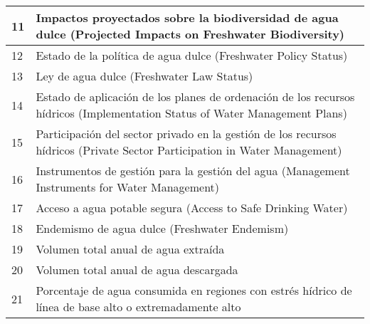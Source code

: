 \begin{longtable}{p{1.75cm}|p{13cm}}
11                                    & Impactos proyectados sobre la biodiversidad de agua dulce (Projected Impacts on Freshwater Biodiversity)                                                  \\ \hline
12                                    & Estado de la política de agua dulce (Freshwater Policy Status)                                                                                          \\ \hline
13                                    & Ley de agua dulce (Freshwater Law Status)                                                                                                         \\ \hline
14                                    & Estado de aplicación de los planes de ordenación de los recursos hídricos (Implementation Status of Water Management Plans)                            \\ \hline
15                                    & Participación del sector privado en la gestión de los recursos hídricos (Private Sector Participation in Water Management)                               \\ \hline
16                                    & Instrumentos de gestión para la gestión del agua (Management Instruments for Water Management)                                                    \\ \hline
17                                    & Acceso a agua potable segura (Access to Safe Drinking Water)                                                                                           \\ \hline
18                                    & Endemismo de agua dulce (Freshwater Endemism)                                                                                                         \\ \hline
19                                    & Volumen total anual de agua extraída                                                                                                                 \\ \hline
20                                    & Volumen total anual de agua descargada                                                                                                             \\ \hline
21                                    & Porcentaje de agua consumida en regiones con estrés hídrico de línea de base alto o extremadamente alto                                               \\ \hline

\end{longtable}
